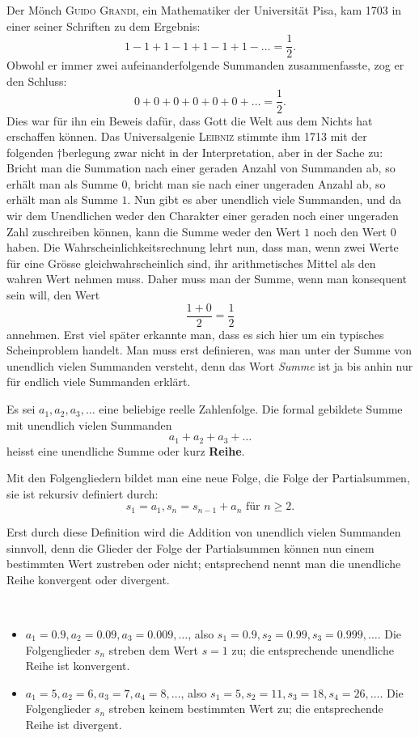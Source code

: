 \documentclass[%
11pt,%
twoside,%
titlepage,%
german,%
headsepline%
]{scrartcl}
\begin{document}
Der M\"onch \textsc{Guido Grandi}, ein Mathematiker der Universit\"at Pisa, kam 1703 in einer seiner Schriften zu dem Ergebnis:
$$1-1+1-1+1-1+1-\dots=\frac{1}{2}.$$
Obwohl er immer zwei aufeinanderfolgende Summanden zusammenfasste, zog er den Schluss:
$$0+0+0+0+0+0+\dots=\frac{1}{2}.$$
Dies war f\"ur ihn ein Beweis daf\"ur, dass Gott die Welt aus dem Nichts hat erschaffen k\"onnen. Das Universalgenie \textsc{Leibniz} stimmte ihm 1713 mit der folgenden †berlegung zwar nicht in der Interpretation, aber in der Sache zu: Bricht man die Summation nach einer geraden Anzahl von Summanden ab, so erh\"alt man als Summe $0$, bricht man sie nach einer ungeraden Anzahl ab, so erh\"alt man als Summe $1$. Nun gibt es aber unendlich viele Summanden, und da wir dem Unendlichen weder den Charakter einer geraden noch einer ungeraden Zahl zuschreiben k\"onnen, kann die Summe weder den Wert $1$ noch den Wert $0$ haben. Die Wahrscheinlichkeitsrechnung lehrt nun, dass man, wenn zwei Werte f\"ur eine Gr\"osse gleichwahrscheinlich sind, ihr arithmetisches Mittel als den wahren Wert nehmen muss. Daher muss man der Summe, wenn man konsequent sein will, den Wert
$$\frac{1+0}{2}=\frac{1}{2}$$
annehmen. Erst viel sp\"ater erkannte man, dass es sich hier um ein typisches Scheinproblem handelt. Man muss erst definieren, was man unter der Summe von unendlich vielen Summanden versteht, denn das Wort \emph{Summe} ist ja bis anhin nur f\"ur endlich viele Summanden erkl\"art.

\begin{cdef}[Reihe]{}
Es sei $a_1,a_2,a_3, \dots$ eine beliebige reelle Zahlenfolge. Die formal gebildete Summe mit unendlich vielen Summanden
$$a_1+a_2+a_3+\dots$$
heisst eine unendliche Summe oder kurz \textbf{Reihe}.
\end{cdef}
Mit den Folgengliedern bildet man eine neue Folge, die Folge der Partialsummen, sie ist rekursiv definiert durch:
$$s_1=a_1, s_n=s_{n-1}+a_n \text{ f\"ur } n\geq2.$$

Erst durch diese Definition wird die Addition von unendlich vielen Summanden sinnvoll, denn die Glieder der Folge der Partialsummen k\"onnen nun einem bestimmten Wert zustreben oder nicht; entsprechend nennt man die unendliche Reihe konvergent oder divergent.

\begin{bsps}
\ \\[-4ex]
\begin{itemize}
\item $a_1=0.9, a_2=0.09, a_3=0.009, \dots$, also $s_1 = 0.9, s_2 = 0.99, s_3 = 0.999, \dots$. Die Folgenglieder $s_n$ streben dem Wert $s=1$ zu; die entsprechende unendliche Reihe ist konvergent.
\item $a_1=5, a_2=6, a_3=7, a_4=8, \dots$, also $s_1 = 5, s_2 = 11, s_3 = 18, s_4 = 26, \dots$. Die Folgenglieder $s_n$ streben keinem bestimmten Wert zu; die entsprechende Reihe ist divergent.
\end{itemize}
\end{bsps}
\end{document}
